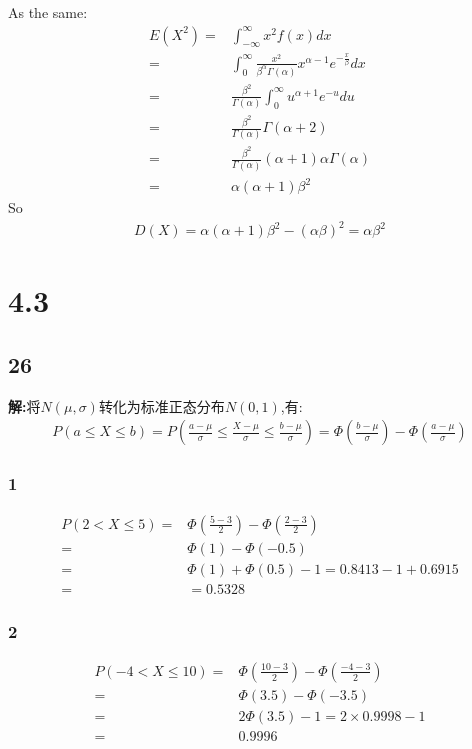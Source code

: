 \documentclass[12pt,a4paper,fontset=none]{ctexart}
\begin{document}
As the same:
\begin{align*}
    E(X^2)= & \int_{-\infty}^{\infty}x^2f(x)dx
    \\=&\int_{0}^{\infty}\frac{x^2}{\beta^\alpha \Gamma (\alpha)}x^{\alpha-1}e^{-\frac{x}{\beta} }dx
    \\=&\frac{\beta^2}{\Gamma(\alpha)}\int_{0}^{\infty}u^{\alpha+1}e^{-u}du
    \\=&\frac{\beta^2}{\Gamma(\alpha)}\Gamma(\alpha+2)
    \\=&\frac{\beta^2}{\Gamma(\alpha)}(\alpha+1)\alpha\Gamma(\alpha)
    \\=&\alpha(\alpha+1)\beta^2
\end{align*}
So
\begin{align*}
    D(X)=\alpha(\alpha+1)\beta^2-(\alpha\beta)^2=\alpha\beta^2
\end{align*}
\section*{4.3}
\subsection*{26}
\textbf{解:}将$N(\mu,\sigma)$转化为标准正态分布$N(0,1)$,有:
\begin{align*}
    P(a\leq X\leq b)=P(\frac{a-\mu}{\sigma} \leq \frac{X-\mu}{\sigma} \leq \frac{b-\mu}{\sigma} )=\varPhi (\frac{b-\mu}{\sigma} )-\varPhi(\frac{a-\mu}{\sigma})
\end{align*}
\subsubsection*{1}
\begin{align*}
    P(2<X\leq 5)= & \varPhi(\frac{5-3}{2} )-\varPhi(\frac{2-3}{2} ) \\=&\varPhi(1)-\varPhi(-0.5)\\=&\varPhi(1)+\varPhi(0.5)-1=0.8413-1+0.6915\\=&=0.5328
\end{align*}
\subsubsection*{2}
\begin{align*}
    P(-4<X\leq 10)= & \varPhi(\frac{10-3}{2} )-\varPhi(\frac{-4-3}{2} ) \\=&\varPhi(3.5)-\varPhi(-3.5)\\=&2\varPhi(3.5)-1=2\times 0.9998-1\\=&0.9996
\end{align*}
\end{document}
